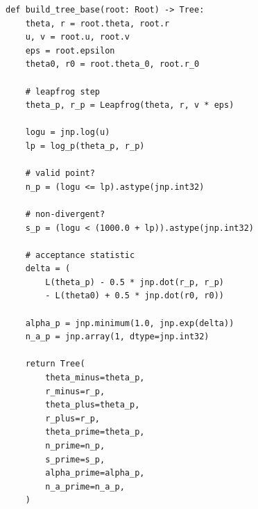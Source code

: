 \documentclass[a4paper,12pt]{article}
\begin{document}
\vspace{.5cm}

\begin{lstlisting}
def build_tree_base(root: Root) -> Tree:
	theta, r = root.theta, root.r
	u, v = root.u, root.v
	eps = root.epsilon
	theta0, r0 = root.theta_0, root.r_0

	# leapfrog step
	theta_p, r_p = Leapfrog(theta, r, v * eps)

	logu = jnp.log(u)
	lp = log_p(theta_p, r_p)

	# valid point?
	n_p = (logu <= lp).astype(jnp.int32)

	# non-divergent?
	s_p = (logu < (1000.0 + lp)).astype(jnp.int32)

	# acceptance statistic
 	delta = (
 		L(theta_p) - 0.5 * jnp.dot(r_p, r_p)
 		- L(theta0) + 0.5 * jnp.dot(r0, r0))
 		
	alpha_p = jnp.minimum(1.0, jnp.exp(delta))
	n_a_p = jnp.array(1, dtype=jnp.int32)

	return Tree(
		theta_minus=theta_p,
		r_minus=r_p,
		theta_plus=theta_p,
		r_plus=r_p,
		theta_prime=theta_p,
		n_prime=n_p,
		s_prime=s_p,
		alpha_prime=alpha_p,
		n_a_prime=n_a_p,
	)
\end{lstlisting}

\vspace{.5cm}
\end{document}
